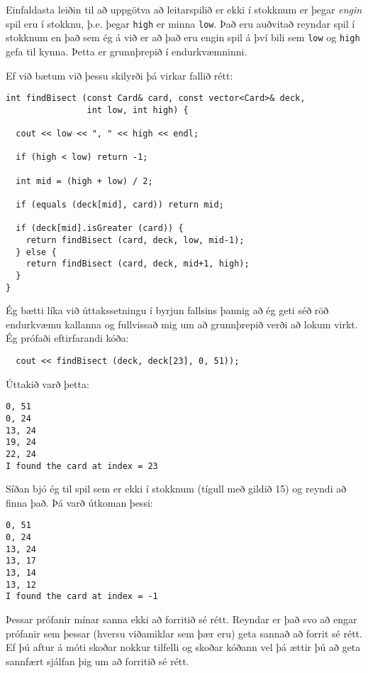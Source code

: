 
Einfaldasta leiðin til að uppgötva að leitarspilið er ekki í stokknum er þegar 
{\em engin} spil eru í stokknu, þ.e. þegar {\tt high} er minna {\tt low}.
Það eru auðvitað reyndar spil í stokknum en það sem ég á við er að það eru engin spil á því bili sem 
{\tt low} og {\tt high} gefa til kynna.
Þetta er grunnþrepið í endurkvæmninni.

Ef við bætum við þessu skilyrði þá virkar fallið rétt:

\begin{verbatim}
int findBisect (const Card& card, const vector<Card>& deck,
                int low, int high) {

  cout << low << ", " << high << endl;

  if (high < low) return -1;

  int mid = (high + low) / 2;

  if (equals (deck[mid], card)) return mid;

  if (deck[mid].isGreater (card)) {
    return findBisect (card, deck, low, mid-1);
  } else {
    return findBisect (card, deck, mid+1, high);
  }
}
\end{verbatim}
%
Ég bætti líka við úttakssetningu í byrjun fallsins þannig að ég geti séð röð endurkvæmu kallanna
og fullvissað mig um að grunnþrepið verði að lokum virkt.
Ég prófaði eftirfarandi kóða:

\begin{verbatim}
  cout << findBisect (deck, deck[23], 0, 51));
\end{verbatim}
%
Úttakið varð þetta: 

\begin{verbatim}
0, 51
0, 24
13, 24
19, 24
22, 24
I found the card at index = 23
\end{verbatim}
%
Síðan bjó ég til spil sem er ekki í stokknum (tígull með gildið 15)
og reyndi að finna það. Þá varð útkoman þessi:

\begin{verbatim}
0, 51
0, 24
13, 24
13, 17
13, 14
13, 12
I found the card at index = -1
\end{verbatim}
%
Þessar prófanir mínar sanna ekki að forritið sé rétt.
Reyndar er það svo að engar prófanir sem þessar (hversu viðamiklar sem þær eru) geta sannað að forrit sé rétt.
Ef þú aftur á móti skoðar nokkur tilfelli og skoðar kóðann vel þá ættir þú að geta sannfært sjálfan þig um að forritið sé rétt.


